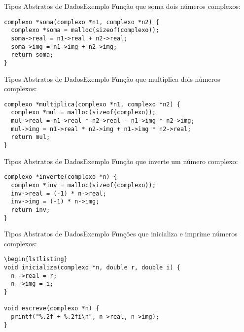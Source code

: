 \documentclass[aspectratio=169]{beamer}
\begin{document}

\begin{frame}[fragile]{Tipos Abstratos de Dados}{Exemplo}
Função que soma dois  números complexos:
\begin{lstlisting}
complexo *soma(complexo *n1, complexo *n2) {
  complexo *soma = malloc(sizeof(complexo));
  soma->real = n1->real + n2->real;
  soma->img = n1->img + n2->img;
  return soma;
}
\end{lstlisting} 
\end{frame}


\begin{frame}[fragile]{Tipos Abstratos de Dados}{Exemplo}
Função que multiplica dois números complexos:
\begin{lstlisting}
complexo *multiplica(complexo *n1, complexo *n2) {
  complexo *mul = malloc(sizeof(complexo));
  mul->real = n1->real * n2->real - n1->img * n2->img;
  mul->img = n1->real * n2->img + n1->img * n2->real;
  return mul;
}
\end{lstlisting} 
\end{frame}


\begin{frame}[fragile]{Tipos Abstratos de Dados}{Exemplo}
Função que inverte um número complexo:
\begin{lstlisting}
complexo *inverte(complexo *n) {
  complexo *inv = malloc(sizeof(complexo));
  inv->real = (-1) * n->real;
  inv->img = (-1) * n->img;
  return inv;
}
\end{lstlisting} 
\end{frame}


\begin{frame}[fragile]{Tipos Abstratos de Dados}{Exemplo}
Funções que inicializa e imprime números complexos:
\begin{lstlisting}
\begin{lstlisting}
void inicializa(complexo *n, double r, double i) {
  n ->real = r;
  n ->img = i;
}

void escreve(complexo *n) {
  printf("%.2f + %.2fi\n", n->real, n->img);
}
\end{lstlisting} 
\end{frame}
\end{document}
